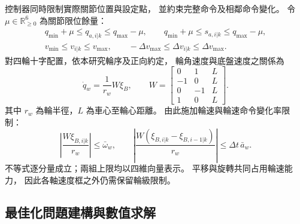 控制器同時限制實際關節位置與設定點，
並約束完整命令及相鄰命令變化。
令 $\mu\in\mathbb R_{\geq0}^{6}$ 為關節限位餘量：
\begin{equation}
    \begin{gathered}
        q_{\min}+\mu\leq q_{a,i|k}\leq q_{\max}-\mu,\qquad
        q_{\min}+\mu\leq s_{a,i|k}\leq q_{\max}-\mu,\\
        v_{\min}\leq v_{i|k}\leq v_{\max},\qquad
        -\Delta v_{\max}\leq\Delta v_{i|k}\leq\Delta v_{\max}.
    \end{gathered}
    \label{eq:ch3_joint_command_limits}
\end{equation}
對四輪十字配置，依本研究輪序及正向約定，
輪角速度與底盤速度之關係為
\begin{equation}
    \dot q_w=\frac{1}{r_w}W\xi_B,\qquad
    W=
    \begin{bmatrix}
        0&1&L\\-1&0&L\\0&-1&L\\1&0&L
    \end{bmatrix}.
    \label{eq:ch3_wheel_command_mapping}
\end{equation}
其中 $r_w$ 為輪半徑，$L$ 為車心至輪心距離。
由此施加輪速與輪速命令變化率限制：
\begin{equation}
    \left|\frac{W\xi_{B,i|k}}{r_w}\right|\leq\bar\omega_w,\qquad
    \left|\frac{W(\xi_{B,i|k}-\xi_{B,i-1|k})}{r_w}\right|
    \leq\Delta t\,\bar a_w .
    \label{eq:ch3_wheel_speed_acceleration_limits}
\end{equation}
不等式逐分量成立；兩組上限均以四維向量表示。
平移與旋轉共同占用輪速能力，
因此各軸速度框之外仍需保留輪級限制。

\subsection{最佳化問題建構與數值求解}
\label{subsec:wholebody_qp_formulation}

